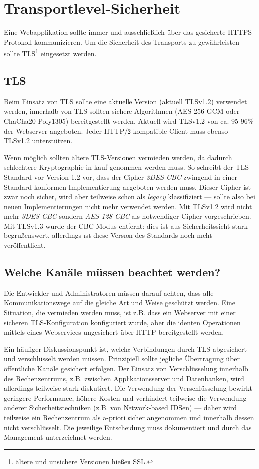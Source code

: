 \section{Transportlevel-Sicherheit}

Eine Webapplikation sollte immer und ausschließlich über das gesicherte HTTPS-Protokoll kommunizieren. Um die Sicherheit des Transports zu gewährleisten sollte TLS\footnote{ältere und unsichere Versionen hießen SSL.} eingesetzt werden.

\subsection{TLS}

Beim Einsatz von TLS sollte eine aktuelle Version (aktuell TLSv1.2) verwendet werden, innerhalb von TLS sollten sichere Algorithmen (AES-256-GCM oder ChaCha20-Poly1305) bereitgestellt werden. Aktuell wird TLSv1.2 von ca. 95-96\% der Webserver angeboten. Jeder HTTP/2 kompatible Client muss ebenso TLSv1.2 unterstützen.

Wenn möglich sollten ältere TLS-Versionen vermieden werden, da dadurch schlechtere Kryptographie in kauf genommen werden muss. So schreibt der TLS-Standard vor Version 1.2 vor, dass der Cipher \textit{3DES-CBC} zwingend in einer Standard-konformen Implementierung angeboten werden muss. Dieser Cipher ist zwar noch sicher, wird aber teilweise schon als \textit{legacy} klassifiziert --- sollte also bei neuen Implementierungen nicht mehr verwendet werden. Mit TLSv1.2 wird nicht mehr \textit{3DES-CBC} sondern \textit{AES-128-CBC} als notwendiger Cipher vorgeschrieben. Mit TLSv1.3 wurde der CBC-Modus entfernt: dies ist aus Sicherheitssicht stark begrüßenswert, allerdings ist diese Version des Standards noch nicht veröffentlicht.

\subsection{Welche Kanäle müssen beachtet werden?}

Die Entwickler und Administratoren müssen darauf achten, dass alle Kommunikationswege auf die gleiche Art und Weise geschützt werden. Eine Situation, die vermieden werden muss, ist z.B. dass ein Webserver mit einer sicheren TLS-Konfiguration konfiguriert wurde, aber die identen Operationen mittels eines Webservices ungesichert über HTTP bereitgestellt werden.

Ein häufiger Diskussionspunkt ist, welche Verbindungen durch TLS abgesichert und verschlüsselt werden müssen. Prinzipiell sollte jegliche Übertragung über öffentliche Kanäle gesichert erfolgen. Der Einsatz von Verschlüsselung innerhalb des Rechenzentrums, z.B. zwischen Applikationsserver und Datenbanken, wird allerdings teilweise stark diskutiert. Die Verwendung der Verschlüsselung bewirkt geringere Performance, höhere Kosten und verhindert teilweise die Verwendung anderer Sicherheitstechniken (z.B. von Network-based IDSen) --- daher wird teilweise ein Rechenzentrum als a-priori sicher angenommen und innerhalb dessen nicht verschlüsselt. Die jeweilige Entscheidung muss dokumentiert und durch das Management unterzeichnet werden.

